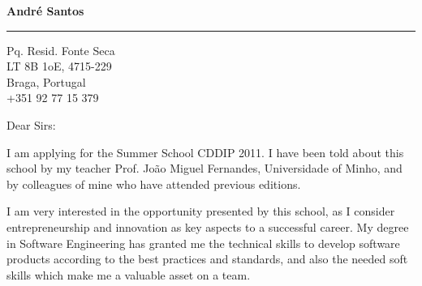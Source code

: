 \documentclass{letter} %
\begin{document}
\signature{André Santos}           %
\longindentation=0pt                       %
\let\raggedleft\raggedright                %
 
 
\begin{letter}{}


\begin{flushleft}
{\large\bf André Santos}
\end{flushleft}
\medskip\hrule height 1pt
\begin{flushright}
\hfill Pq. Resid. Fonte Seca \\
\hfill LT 8B 1oE, 4715-229 \\
\hfill Braga, Portugal \\
\hfill +351 92 77 15 379
\end{flushright} 
\vfill %

 
\opening{Dear Sirs:} 
 
\noindent I am applying for the Summer School CDDIP 2011. I have 
been told about this school by my teacher Prof. João Miguel
Fernandes, Universidade of Minho, and by colleagues of mine 
who have attended previous editions.
 
\noindent I am very interested in the opportunity presented by 
this school, as I consider entrepreneurship and innovation as key 
aspects to a successful career. My degree in Software Engineering
has granted me the technical skills to develop software products
according to the best practices and standards, and also the needed
soft skills which make me a valuable asset on a team.
 

\end{letter}
\end{document}
